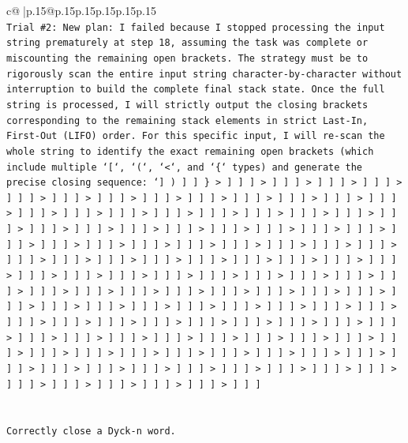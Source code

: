 \documentclass{article}
\begin{document}
{\begin{supertabular}{c@{$\;$}|p{.15\linewidth}@{}p{.15\linewidth}p{.15\linewidth}p{.15\linewidth}p{.15\linewidth}p{.15\linewidth}}
{{{\\ 
\texttt{Trial \#2: New plan: I failed because I stopped processing the input string prematurely at step 18, assuming the task was complete or miscounting the remaining open brackets. The strategy must be to rigorously scan the entire input string character{-}by{-}character without interruption to build the complete final stack state. Once the full string is processed, I will strictly output the closing brackets corresponding to the remaining stack elements in strict Last{-}In, First{-}Out (LIFO) order. For this specific input, I will re{-}scan the whole string to identify the exact remaining open brackets (which include multiple `{[}`, `(`, `<`, and `\{` types) and generate the precise closing sequence: `{]} ) {]} {]} \} > {]} {]} {]} > {]} {]} {]} > {]} {]} {]} > {]} {]} {]} > {]} {]} {]} > {]} {]} {]} > {]} {]} {]} > {]} {]} {]} > {]} {]} {]} > {]} {]} {]} > {]} {]} {]} > {]} {]} {]} > {]} {]} {]} > {]} {]} {]} > {]} {]} {]} > {]} {]} {]} > {]} {]} {]} > {]} {]} {]} > {]} {]} {]} > {]} {]} {]} > {]} {]} {]} > {]} {]} {]} > {]} {]} {]} > {]} {]} {]} > {]} {]} {]} > {]} {]} {]} > {]} {]} {]} > {]} {]} {]} > {]} {]} {]} > {]} {]} {]} > {]} {]} {]} > {]} {]} {]} > {]} {]} {]} > {]} {]} {]} > {]} {]} {]} > {]} {]} {]} > {]} {]} {]} > {]} {]} {]} > {]} {]} {]} > {]} {]} {]} > {]} {]} {]} > {]} {]} {]} > {]} {]} {]} > {]} {]} {]} > {]} {]} {]} > {]} {]} {]} > {]} {]} {]} > {]} {]} {]} > {]} {]} {]} > {]} {]} {]} > {]} {]} {]} > {]} {]} {]} > {]} {]} {]} > {]} {]} {]} > {]} {]} {]} > {]} {]} {]} > {]} {]} {]} > {]} {]} {]} > {]} {]} {]} > {]} {]} {]} > {]} {]} {]} > {]} {]} {]} > {]} {]} {]} > {]} {]} {]} > {]} {]} {]} > {]} {]} {]} > {]} {]} {]} > {]} {]} {]} > {]} {]} {]} > {]} {]} {]} > {]} {]} {]} > {]} {]} {]} > {]} {]} {]} > {]} {]} {]} > {]} {]} {]} > {]} {]} {]} > {]} {]} {]} > {]} {]} {]} > {]} {]} {]} > {]} {]} {]} > {]} {]} {]} > {]} {]} {]} > {]} {]} {]} > {]} {]} {]} > {]} {]} {]} > {]} {]} {]} > {]} {]} {]} > {]} {]} {]} > {]} {]} {]} > {]} {]} {]} > {]} {]} {]} > {]} {]} {]} > {]} {]} {]} > {]} {]} {]} > {]} {]} {]} > {]} {]} {]} > {]} {]} {]} > {]} {]} {]} > {]} {]} {]} > {]} {]} {]} > {]} {]} {]} > {]} {]} {]} > {]} {]} {]} > {]} {]} {]} > {]} {]} {]} > {]} {]} {]} > {]} {]} {]} > {]} {]} {]} > {]} {]} {]} > {]} {]} {]} > {]} {]} {]} > {]} {]} {]} > {]} {]} {]} > {]} {]} {]} > {]} {]} {]}} \\
\\ 
\\ 
\texttt{Correctly close a Dyck{-}n word.} \\
}}}
\end{supertabular}}
\end{document}
